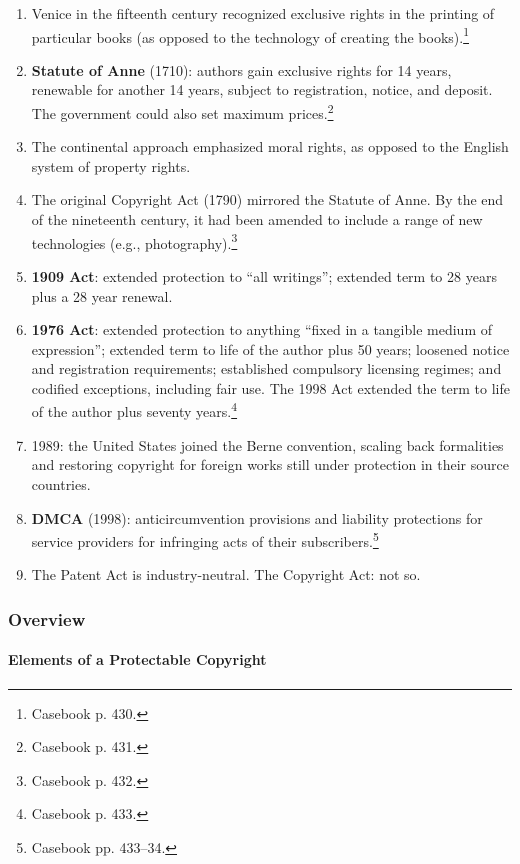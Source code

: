 \begin{enumerate}
    \item Venice in the fifteenth century recognized exclusive rights in the 
    printing of particular books (as opposed to the technology of creating the 
    books).\footnote{Casebook p. 430.}
    \item \textbf{Statute of Anne} (1710): authors gain exclusive rights for 
    14 years, renewable for another 14 years, subject to registration, notice, 
    and deposit. The government could also set maximum 
    prices.\footnote{Casebook p. 431.}
    \item The continental approach emphasized moral rights, as opposed to the 
    English system of property rights.
    \item The original Copyright Act (1790) mirrored the Statute of Anne. By 
    the end of the nineteenth century, it had been amended to include a range 
    of new technologies (e.g., photography).\footnote{Casebook p. 432.}
    \item \textbf{1909 Act}: extended protection to ``all writings''; extended 
    term to 28 years plus a 28 year renewal.
    \item \textbf{1976 Act}: extended protection to anything ``fixed in a 
    tangible medium of expression''; extended term to life of the author plus 
    50 years; loosened notice and registration requirements; established 
    compulsory licensing regimes; and codified exceptions, including fair use. 
    The 1998 Act extended the term to life of the author plus seventy 
    years.\footnote{Casebook p. 433.}
    \item 1989: the United States joined the Berne convention, scaling back 
    formalities and restoring copyright for foreign works still under 
    protection in their source countries.
    \item \textbf{DMCA} (1998): anticircumvention provisions and liability 
    protections for service providers for infringing acts of their 
    subscribers.\footnote{Casebook pp. 433--34.}
    \item The Patent Act is industry-neutral. The Copyright Act: not so.
\end{enumerate}

\subsubsection{Overview}

\paragraph{Elements of a Protectable Copyright}

